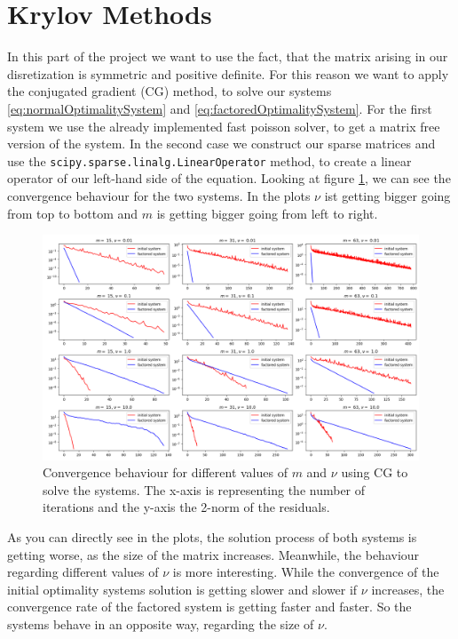 \documentclass{amsart}
\theoremstyle{definition}
\theoremstyle{remark}
\numberwithin{equation}{section}
\begin{document}
\section{Krylov Methods}
In this part of the project we want to use the fact, that the matrix arising in our disretization is symmetric and positive definite. For this reason we want to apply the conjugated gradient (CG) method, to solve our systems \eqref{eq:normalOptimalitySystem} and \eqref{eq:factoredOptimalitySystem}.
For the first system we use the already implemented fast poisson solver, to get a matrix free version of the system. In the second case we construct our sparse matrices and use the \texttt{scipy.sparse.linalg.LinearOperator} method, to create a linear operator of our left-hand side of the equation.
Looking at figure \ref{fig:CG-convergence}, we can see the  convergence behaviour for the two systems. In the plots $\nu$ ist getting bigger going from top to bottom and $m$ is getting bigger going from left to right.
\begin{figure}[h!]
\centering
\includegraphics[scale=0.45]{./imgs/CG_analysis}
\caption{Convergence behaviour for different values of $m$ and $\nu$ using CG to solve the systems. The x-axis is representing the number of iterations
and the y-axis the 2-norm of the residuals.}
\label{fig:CG-convergence}
\end{figure}
As you can directly see in the plots, the solution process of both systems is getting worse, as the size of the matrix increases. Meanwhile, the behaviour 
regarding different values of $\nu$ is more interesting. While the convergence of the initial optimality systems solution is getting slower and slower if 
$\nu$ increases, the convergence rate of the factored system is getting faster and faster. So the systems behave in an opposite way, regarding the size of 
$\nu$.
\end{document}
